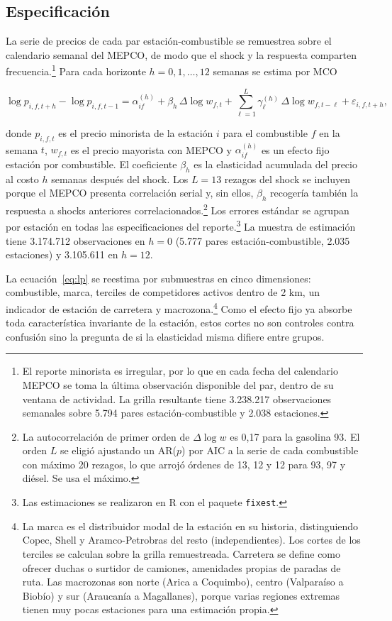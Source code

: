\documentclass[11pt]{article}
\begin{document}
\subsection{Especificación}
\label{sec:lp_especificacion}

La serie de precios de cada par estación-combustible se remuestrea sobre el
calendario semanal del MEPCO, de modo que el shock y la respuesta comparten
frecuencia.\footnote{El reporte minorista es irregular, por lo que en cada
fecha del calendario MEPCO se toma la última observación disponible del par,
dentro de su ventana de actividad. La grilla resultante tiene 3.238.217
observaciones semanales sobre 5.794 pares estación-combustible y 2.038
estaciones.} Para cada horizonte $h = 0, 1, \dots, 12$ semanas se estima por
MCO

\begin{equation}
\label{eq:lp}
\log p_{i,f,t+h} - \log p_{i,f,t-1}
= \alpha_{if}^{(h)}
+ \beta_h \, \Delta \log w_{f,t}
+ \sum_{\ell=1}^{L} \gamma_{\ell}^{(h)} \, \Delta \log w_{f,t-\ell}
+ \varepsilon_{i,f,t+h},
\end{equation}

donde $p_{i,f,t}$ es el precio minorista de la estación $i$ para el
combustible $f$ en la semana $t$, $w_{f,t}$ es el precio mayorista con MEPCO
y $\alpha_{if}^{(h)}$ es un efecto fijo estación por combustible. El
coeficiente $\beta_h$ es la elasticidad acumulada del precio al costo $h$
semanas después del shock. Los $L = 13$ rezagos del shock se incluyen porque
el MEPCO presenta correlación serial y, sin ellos, $\beta_h$ recogería
también la respuesta a shocks anteriores correlacionados.\footnote{La
autocorrelación de primer orden de $\Delta \log w$ es 0,17 para la gasolina
93. El orden $L$ se eligió ajustando un AR($p$) por AIC a la serie de cada
combustible con máximo 20 rezagos, lo que arrojó órdenes de 13, 12 y 12 para
93, 97 y diésel. Se usa el máximo.} Los errores estándar se agrupan por
estación en todas las especificaciones del reporte.\footnote{Las estimaciones
se realizaron en R con el paquete \texttt{fixest}.} La muestra de estimación
tiene 3.174.712 observaciones en $h = 0$ (5.777 pares estación-combustible,
2.035 estaciones) y 3.105.611 en $h = 12$.

La ecuación~\eqref{eq:lp} se reestima por submuestras en cinco dimensiones:
combustible, marca, terciles de competidores activos dentro de 2 km, un
indicador de estación de carretera y macrozona.\footnote{La marca es el
distribuidor modal de la estación en su historia, distinguiendo Copec, Shell
y Aramco-Petrobras del resto (independientes). Los cortes de los terciles se
calculan sobre la grilla remuestreada. Carretera se define como ofrecer
duchas o surtidor de camiones, amenidades propias de paradas de ruta. Las
macrozonas son norte (Arica a Coquimbo), centro (Valparaíso a Biobío) y sur
(Araucanía a Magallanes), porque varias regiones extremas tienen muy pocas
estaciones para una estimación propia.} Como el efecto fijo ya absorbe toda
característica invariante de la estación, estos cortes no son controles
contra confusión sino la pregunta de si la elasticidad misma difiere entre
grupos.
\end{document}
